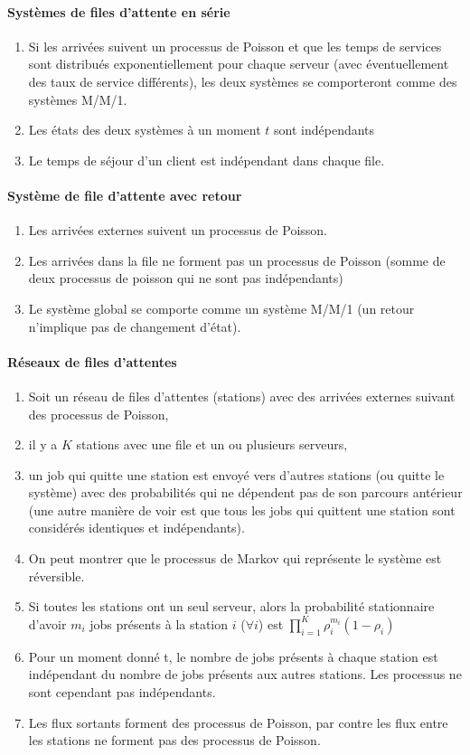 \documentclass[paper=a4,fontsize=8pt,pagesize,DIV=calc]{scrartcl}
\begin{document}
\begin{multicols}{3}
\paragraph{Systèmes de files d’attente en série}
\begin{enumerate}
\item Si les arrivées suivent un processus de Poisson et que les temps de services sont distribués exponentiellement pour chaque serveur (avec éventuellement des taux de service différents), les deux systèmes se comporteront comme des systèmes M/M/1.
\item Les états des deux systèmes à un moment $t$ sont indépendants
\item Le temps de séjour d’un client est indépendant dans chaque file.
\end{enumerate}
\paragraph{Système de file d’attente avec retour}
\begin{enumerate}
\item Les arrivées externes suivent un processus de Poisson.
\item Les arrivées dans la file ne forment pas un processus de Poisson (somme de deux processus de poisson qui ne sont pas indépendants)
\item Le système global se comporte comme un système
M/M/1 (un retour n’implique pas de changement d’état).
\end{enumerate}
\paragraph{Réseaux de files d’attentes}
\begin{enumerate}
\item Soit un réseau de files d’attentes (stations) avec des arrivées externes suivant des processus de Poisson, 
\item il y a $K$ stations avec une file et un ou plusieurs serveurs, 
\item un job qui quitte une station est envoyé vers d’autres stations (ou quitte le système) avec des probabilités qui ne dépendent pas de son parcours antérieur (une autre manière de voir est que tous les jobs qui quittent une station sont considérés identiques et indépendants).
\item On peut montrer que le processus de Markov qui
représente le système est réversible.
\item Si toutes les stations ont un seul serveur, alors la probabilité stationnaire d’avoir $m_i$ jobs présents à la station $i$ ($\forall i$) est $\prod_{i=1}^K \rho_i^{m_i}(1-\rho_i)$
\item Pour un moment donné t, le nombre de jobs présents à chaque station est indépendant du nombre de jobs présents aux autres stations. Les processus ne sont cependant pas indépendants.
\item Les flux sortants forment des processus de Poisson, par contre les flux entre les stations ne forment pas des processus de Poisson.
\end{enumerate}

\end{multicols}
\end{document}
